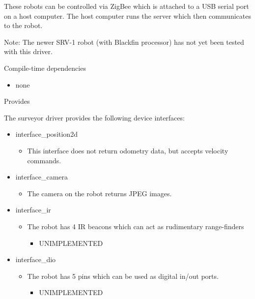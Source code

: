 These robots can be controlled via ZigBee which is attached to a USB serial port on a host computer. The host computer runs the server which then communicates to the robot.

\begin{Desc}
\item[Note:]The newer SRV-1 robot (with Blackfin processor) has not yet been tested with this driver.\end{Desc}
\begin{Desc}
\item[Compile-time dependencies]\end{Desc}
\begin{itemize}
\item none\end{itemize}


\begin{Desc}
\item[Provides]\end{Desc}
The surveyor driver provides the following device interfaces:

\begin{itemize}
\item interface\_\-position2d\begin{itemize}
\item This interface does not return odometry data, but accepts velocity commands.\end{itemize}
\end{itemize}


\begin{itemize}
\item interface\_\-camera\begin{itemize}
\item The camera on the robot returns JPEG images.\end{itemize}
\end{itemize}


\begin{itemize}
\item interface\_\-ir\begin{itemize}
\item The robot has 4 IR beacons which can act as rudimentary range-finders\begin{itemize}
\item UNIMPLEMENTED\end{itemize}
\end{itemize}
\end{itemize}


\begin{itemize}
\item interface\_\-dio\begin{itemize}
\item The robot has 5 pins which can be used as digital in/out ports.\begin{itemize}
\item UNIMPLEMENTED\end{itemize}
\end{itemize}
\end{itemize}


